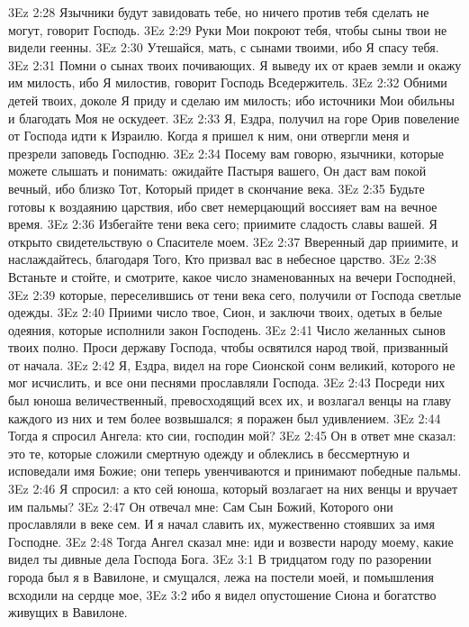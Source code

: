\vs 3Ez 2:28 Язычники будут завидовать тебе, но ничего против тебя сделать не могут, говорит Господь.
\vs 3Ez 2:29 Руки Мои покроют тебя, чтобы сыны твои не видели геенны.
\vs 3Ez 2:30 Утешайся, мать, с сынами твоими, ибо Я спасу тебя.
\vs 3Ez 2:31 Помни о сынах твоих почивающих. Я выведу их от краев земли и окажу им милость, ибо Я милостив, говорит Господь Вседержитель.
\vs 3Ez 2:32 Обними детей твоих, доколе Я приду и сделаю им милость; ибо источники Мои обильны и благодать Моя не оскудеет.
\rsbpar\vs 3Ez 2:33 Я, Ездра, получил на горе Орив повеление от Господа идти к Израилю. Когда я пришел к ним, они отвергли меня и презрели заповедь Господню.
\vs 3Ez 2:34 Посему вам говорю, язычники, которые можете слышать и понимать: ожидайте Пастыря вашего, Он даст вам покой вечный, ибо близко Тот, Который придет в скончание века.
\vs 3Ez 2:35 Будьте готовы к воздаянию царствия, ибо свет немерцающий воссияет вам на вечное время.
\vs 3Ez 2:36 Избегайте тени века сего; приимите сладость славы вашей. Я открыто свидетельствую о Спасителе моем.
\vs 3Ez 2:37 Вверенный дар приимите, и наслаждайтесь, благодаря Того, Кто призвал вас в небесное царство.
\vs 3Ez 2:38 Встаньте и стойте, и смотрите, какое число знаменованных на вечери Господней,
\vs 3Ez 2:39 которые, переселившись от тени века сего, получили от Господа светлые одежды.
\vs 3Ez 2:40 Приими число твое, Сион, и заключи твоих, одетых в белые одеяния, которые исполнили закон Господень.
\vs 3Ez 2:41 Число желанных сынов твоих полно. Проси державу Господа, чтобы освятился народ твой, призванный от начала.
\rsbpar\vs 3Ez 2:42 Я, Ездра, видел на горе Сионской сонм великий, которого не мог исчислить, и все они песнями прославляли Господа.
\vs 3Ez 2:43 Посреди них был юноша величественный, превосходящий всех их, и возлагал венцы на главу каждого из них и тем более возвышался; я поражен был удивлением.
\vs 3Ez 2:44 Тогда я спросил Ангела: кто сии, господин мой?
\vs 3Ez 2:45 Он в ответ мне сказал: это те, которые сложили смертную одежду и облеклись в бессмертную и исповедали имя Божие; они теперь увенчиваются и принимают победные пальмы.
\vs 3Ez 2:46 Я спросил: а кто сей юноша, который возлагает на них венцы и вручает им пальмы?
\vs 3Ez 2:47 Он отвечал мне: Сам Сын Божий, Которого они прославляли в веке сем. И я начал славить их, мужественно стоявших за имя Господне.
\vs 3Ez 2:48 Тогда Ангел сказал мне: иди и возвести народу моему, какие видел ты дивные дела Господа Бога.
\vs 3Ez 3:1 В тридцатом году по разорении города был я в Вавилоне, и смущался, лежа на постели моей, и помышления всходили на сердце мое,
\vs 3Ez 3:2 ибо я видел опустошение Сиона и богатство живущих в Вавилоне.
